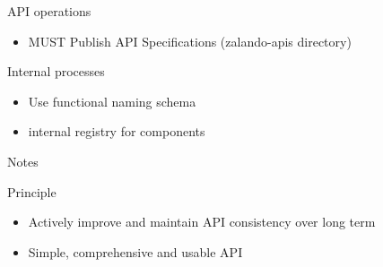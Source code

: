 \begin{frame}{API operations}

\begin{itemize}
\tightlist
\item
  MUST Publish API Specifications (zalando-apis directory)
\end{itemize}

\end{frame}

\begin{frame}{Internal processes}

\begin{itemize}
\tightlist
\item
  Use functional naming schema
\item
  internal registry for components
\end{itemize}

\end{frame}

\begin{frame}{Notes}

\begin{block}{Principle}

\begin{itemize}
\tightlist
\item
  Actively improve and maintain API consistency over long term
\item
  Simple, comprehensive and usable API
\end{itemize}

\end{block}

\end{frame}
